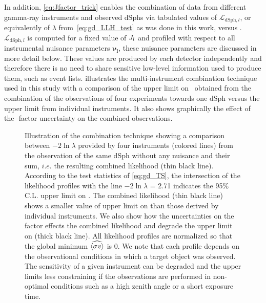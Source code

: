 \rescaleTrick
In addition, \cref{eq:Jfactor_trick} enables the combination of data from different gamma-ray instruments and observed dSphs via tabulated values of $\mathcal{L}_{\mathrm{dSph},l}$, or equivalently of $\lambda$ from~\cref{eq:gd_LLH_test} as was done in this work, versus \sv.
$\mathcal{L}_{\mathrm{dSph},l}$ is computed for a fixed value of $J_l$ and profiled with respect to all instrumental nuisance parameters $\bm{\nu_l}$, these nuisance parameters are discussed in more detail below.
These values are produced by each detector independently and therefore there is no need to share sensitive low-level information used to produce them, such as event lists.
 illustrates the multi-instrument combination technique used in this study with a comparison of the upper limit on \sv~obtained from the combination of the observations of four experiments towards one dSph versus the upper limit from individual instruments.
It also shows graphically the effect of the \J-factor uncertainty on the combined observations.

\begin{figure}[t]
    \caption{Illustration of the combination technique showing a comparison between $-2\ln  \lambda$ provided by four instruments (colored lines) from the observation of the same dSph without any \J nuisance and their sum, $i.e.$ the resulting combined likelihood (thin black line). According to the test statistics of \cref{eq:gd_TS}, the intersection of the likelihood profiles with the line $-2\ln  \lambda$ = 2.71 indicates the 95\% C.L. upper limit on \sv. The combined likelihood (thin black line) shows a smaller value of upper limit on \sv than those derived by individual instruments. We also show how the uncertainties on the \J factor effects the combined likelihood and degrade the upper limit on \sv (thick black line). All likelihood profiles are normalized so that the global minimum $\widehat{\langle \sigma \mathit{v} \rangle}$ is 0. We note that each profile depends on the observational conditions in which a target object was observed. The sensitivity of a given instrument can be degraded and the upper limits less constraining if the observations are performed in non-optimal conditions such as a high zenith angle or a short exposure time.}
    \label{fig:illustration_combination}
\end{figure}

